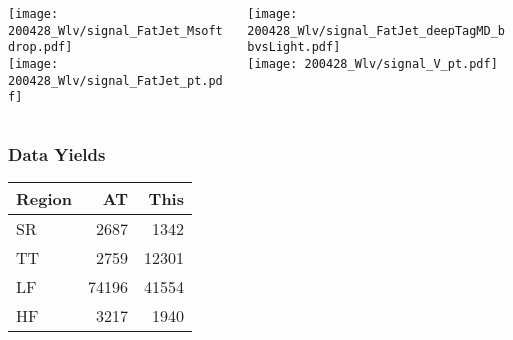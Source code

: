 \documentclass{beamer}
\newcommand{\beginbackup}{
  \newcounter{framenumbervorappendix}
  \setcounter{framenumbervorappendix}{\value{framenumber}}
}
\newcommand{\backupend}{
  \addtocounter{framenumbervorappendix}{-\value{framenumber}}
  \addtocounter{framenumber}{\value{framenumbervorappendix}}
}
\begin{document}
\begin{frame}
  \begin{columns}
    \begin{column}{0.3\linewidth}
      \centering
      \texttt{[image: 200428\_Wlv/signal\_FatJet\_Msoftdrop.pdf]} \\
      \texttt{[image: 200428\_Wlv/signal\_FatJet\_pt.pdf]}
    \end{column}
    \begin{column}{0.3\linewidth}
      \centering
      \texttt{[image: 200428\_Wlv/signal\_FatJet\_deepTagMD\_bbvsLight.pdf]} \\
      \texttt{[image: 200428\_Wlv/signal\_V\_pt.pdf]}
    \end{column}
  \end{columns}
\end{frame}

\begin{frame}
  \frametitle{Data Yields}
  \centering
  \begin{tabular}{l|r|r}
    Region & AT & This \\
    \hline
    SR & 2687 & 1342 \\
    TT & 2759 & 12301 \\
    LF & 74196 & 41554 \\
    HF & 3217 & 1940 \\
  \end{tabular}
\end{frame}

\begin{comment}
\beginbackup

\begin{frame}
  \centering
    {\Huge \bf\sffamily Backup Slides}
\end{frame}



\backupend
\end{comment}
\end{document}
